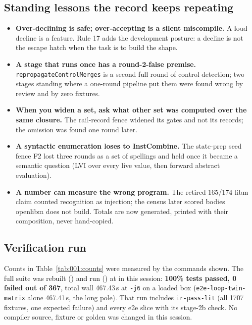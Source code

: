 \subsection*{Standing lessons the record keeps repeating}
\begin{itemize}
  \item \textbf{Over-declining is safe; over-accepting is a silent miscompile.} A loud decline is a
    feature. Rule 17 adds the development posture: a decline is not the escape hatch when the task is
    to build the shape.
  \item \textbf{A stage that runs once has a round-2-false premise.} \texttt{repropagateControlMerges}
    is a second full round of control detection; two stages standing where a one-round pipeline put
    them were found wrong by review and by zero fixtures.
  \item \textbf{When you widen a set, ask what other set was computed over the same closure.} The
    rail-record fence widened its gates and not its records; the omission was found one round later.
  \item \textbf{A syntactic enumeration loses to InstCombine.} The state-prep seed fence F2 lost three
    rounds as a set of spellings and held once it became a semantic question (LVI over every live
    value, then forward abstract evaluation).
  \item \textbf{A number can measure the wrong program.} The retired 165/174 libm claim counted
    recognition as injection; the census later scored bodies openlibm does not build. Totals are now
    generated, printed with their composition, never hand-copied.
\end{itemize}

\subsection*{Verification run}
Counts in Table~\ref{tab:001:counts} were measured by the commands shown. The full suite was rebuilt
() and run () at
 in this session: \textbf{100\% tests passed, 0 failed out of 367}, total wall 467.43\,s at \texttt{-j6} on a loaded box (\texttt{e2e-loop-twin-matrix} alone 467.41\,s, the long pole). That run includes \texttt{ir-pass-lit} (all 1707 fixtures, one expected failure) and every e2e slice with its stage-2b check. No compiler source, fixture or
golden was changed in this session.

